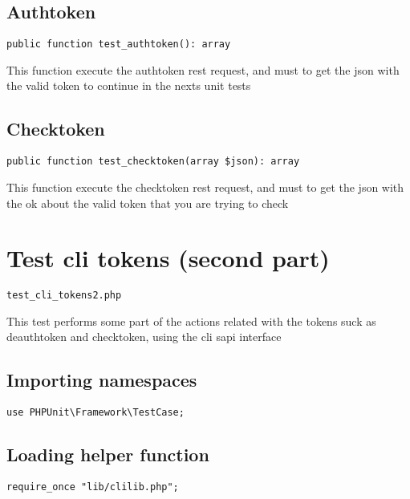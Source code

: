 \documentclass[a4paper]{book}
\begin{document}
\hypertarget{toc35}{}
\subsection{Authtoken}

\begin{lstlisting}
public function test_authtoken(): array
\end{lstlisting}

This function execute the authtoken rest request, and must to get the
json with the valid token to continue in the nexts unit tests

\hypertarget{toc36}{}
\subsection{Checktoken}

\begin{lstlisting}
public function test_checktoken(array $json): array
\end{lstlisting}

This function execute the checktoken rest request, and must to get the
json with the ok about the valid token that you are trying to check

\hypertarget{toc37}{}
\section{Test cli tokens (second part)}

\begin{lstlisting}
test_cli_tokens2.php
\end{lstlisting}

This test performs some part of the actions related with the tokens suck
as deauthtoken and checktoken, using the cli sapi interface

\hypertarget{toc38}{}
\subsection{Importing namespaces}

\begin{lstlisting}
use PHPUnit\Framework\TestCase;
\end{lstlisting}

\hypertarget{toc39}{}
\subsection{Loading helper function}

\begin{lstlisting}
require_once "lib/clilib.php";
\end{lstlisting}
\end{document}
